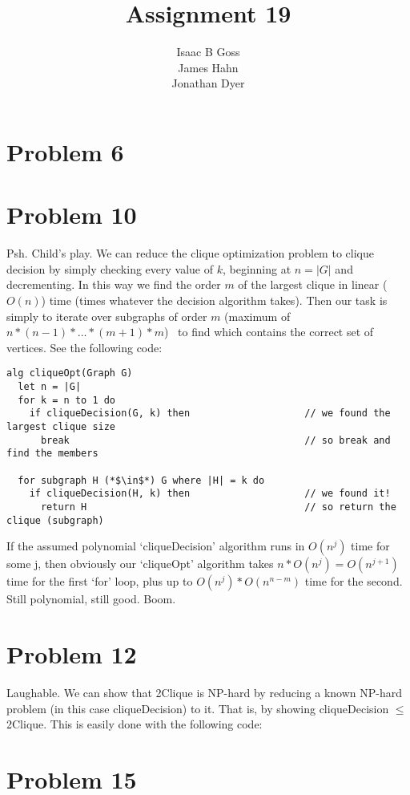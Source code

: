 \documentclass{article}
\author{Isaac B Goss\\ James Hahn\\ Jonathan Dyer}
\title{Assignment 19}
\providecommand{\prob}[1]{\section*{Problem #1}}
\begin{document}
\maketitle
\prob{6}




\prob{10}
Psh. Child's play.
We can reduce the clique optimization problem to clique decision by simply checking every value of $k$,
beginning at $n = |G|$ and decrementing.
In this way we find the order $m$ of the largest clique in linear ($O(n)$) time (times whatever the decision algorithm takes).
Then our task is simply to iterate over subgraphs of order $m$ (maximum of $n*(n-1)*\dots*(m+1)*m$) \
to find which contains the correct set of vertices. See the following code:
\begin{lstlisting}
alg cliqueOpt(Graph G)
  let n = |G|
  for k = n to 1 do
    if cliqueDecision(G, k) then                    // we found the largest clique size
      break                                         // so break and find the members

  for subgraph H (*$\in$*) G where |H| = k do
    if cliqueDecision(H, k) then                    // we found it!
      return H                                      // so return the clique (subgraph)
\end{lstlisting}
If the assumed polynomial `cliqueDecision' algorithm runs in $O(n^j)$ time for some j,
then obviously our `cliqueOpt' algorithm takes $n*O(n^j) = O(n^{j+1})$ time for the first `for' loop,
plus up to $O(n^j) * O(n^{n-m})$ time for the second.
Still polynomial, still good. Boom.

\prob{12}
Laughable.
We can show that 2Clique is NP-hard by reducing a known NP-hard problem (in this case cliqueDecision) to it. That is, by showing
cliqueDecision $\leq$ 2Clique. This is easily done with the following code:


\prob{15}
\end{document}
